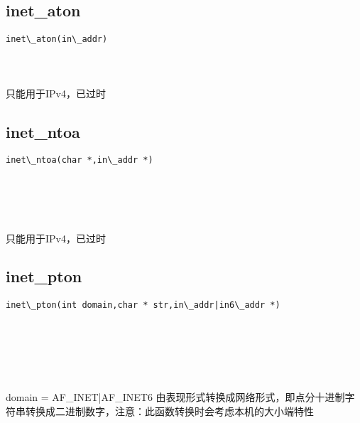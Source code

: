 \documentclass[10pt,a4paper]{article}
\begin{document}
\subsection{inet\_aton}
\begin{spacing}{2.0}
\lstset{language=C,numbers=none}
\begin{lstlisting}
inet\_aton(in\_addr)
\end{lstlisting}
{\large\color[rgb]{0.2,0.4,0.6}{in\_addr:}}
\paragraph{ \ \ }只能用于IPv4，已过时
\end{spacing}

\subsection{inet\_ntoa}
\begin{spacing}{2.0}
\lstset{language=C,numbers=none}
\begin{lstlisting}
inet\_ntoa(char *,in\_addr *)
\end{lstlisting}
{\large\color[rgb]{0.2,0.4,0.6}{*:}} \\
{\large\color[rgb]{0.2,0.4,0.6}{*:}}
\paragraph{ \ \ }只能用于IPv4，已过时
\end{spacing}

\subsection{inet\_pton}
\begin{spacing}{2.0}
\lstset{language=C,numbers=none}
\begin{lstlisting}
inet\_pton(int domain,char * str,in\_addr|in6\_addr *)
\end{lstlisting}
{\large\color[rgb]{0.2,0.4,0.6}{domain:}} \\
{\large\color[rgb]{0.2,0.4,0.6}{str:}} \\
{\large\color[rgb]{0.2,0.4,0.6}{*:}}
\paragraph{ \ \ }domain = AF\_INET|AF\_INET6 由表现形式转换成网络形式，即点分十进制字符串转换成二进制数字，注意：此函数转换时会考虑本机的大小端特性
\end{spacing}
\end{document}
